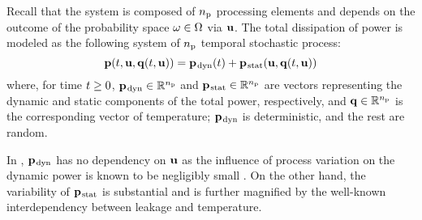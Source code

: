 Recall that the system is composed of ${n_\text{p}}$ processing elements and depends on the outcome of the probability space $\omega \in \Omega$ via $\mathbf{u}$.
The total dissipation of power is modeled as the following system of ${n_\text{p}}$ temporal stochastic process:
\begin{equation} \elab{power-model}
  \vp(\t, \vu, \vq(\t, \vu)) = \vp_\dynamic(\t) + \vp_\static(\vu, \vq(\t, \vu))
\end{equation}
where, for time $t \geq 0$, $\mathbf{p}_{\text{\kern0.1emdyn}} \in \mathbb{R}^{n_\text{p}}$ and $\mathbf{p}_{\text{\kern0.1emstat}} \in \mathbb{R}^{n_\text{p}}$ are vectors representing the dynamic and static components of the total power, respectively, and $\mathbf{q} \in \mathbb{R}^{n_\text{p}}$ is the corresponding vector of temperature; $\mathbf{p}_{\text{\kern0.1emdyn}}$ is deterministic, and the rest are random.
\begin{remark}
In , \textnormal{$\mathbf{p}_{\text{\kern0.1emdyn}}$} has no dependency on $\mathbf{u}$ as the influence of process variation on the dynamic power is known to be negligibly small \cite{srivastava2010}.
On the other hand, the variability of \textnormal{$\mathbf{p}_{\text{\kern0.1emstat}}$} is substantial and is further magnified by the well-known interdependency between leakage and temperature.
\end{remark}
